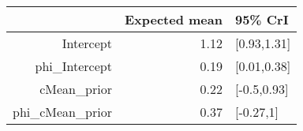 \begin{tabular}{rrl}
  \hline
 & Expected mean & 95\% CrI \\ 
  \hline
Intercept & 1.12 & [0.93,1.31] \\ 
  phi\_Intercept & 0.19 & [0.01,0.38] \\ 
  cMean\_prior & 0.22 & [-0.5,0.93] \\ 
  phi\_cMean\_prior & 0.37 & [-0.27,1] \\ 
   \hline
\end{tabular}

